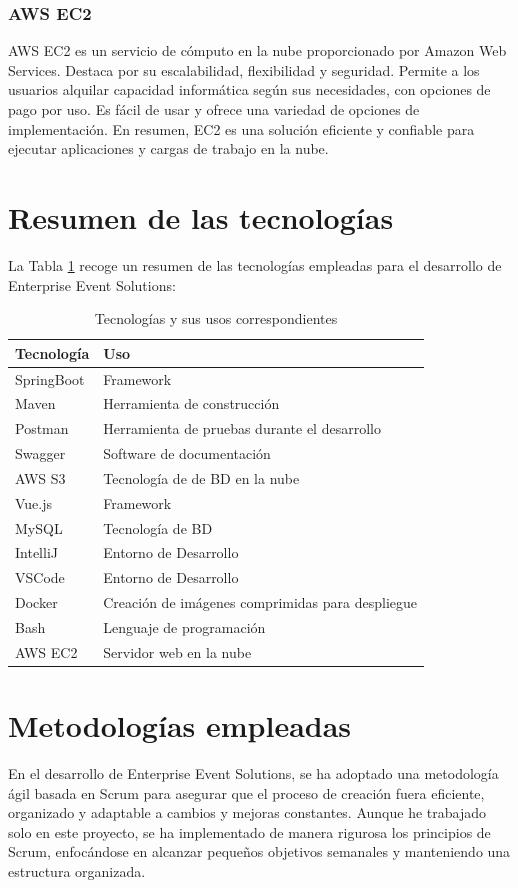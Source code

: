\subsubsection{AWS EC2}
AWS EC2 es un servicio de cómputo en la nube proporcionado por Amazon Web Services. Destaca por su escalabilidad, flexibilidad y seguridad.
Permite a los usuarios alquilar capacidad informática según sus necesidades, con opciones de pago por uso. Es fácil de usar y ofrece una variedad
de opciones de implementación. En resumen, EC2 es una solución eficiente y confiable para ejecutar aplicaciones y cargas de trabajo en la nube.

\section{Resumen de las tecnologías}
La Tabla \ref{tabla:tecnologias_usos} recoge un resumen de las tecnologías empleadas para el desarrollo de Enterprise Event Solutions:

\begin{table}[h]
\begin{tabular}{ p{3cm} l  }

    \hline
    Tecnología& Uso \\
    \hline
    SpringBoot   & Framework \\
    Maven &   Herramienta de construcción \\
    Postman & Herramienta de pruebas durante el desarrollo \\
    Swagger & Software de documentación \\
    AWS S3& Tecnología de de BD en la nube  \\
    Vue.js & Framework  \\
    MySQL    & Tecnología de BD \\
    IntelliJ&   Entorno de Desarrollo  \\
    VSCode& Entorno de Desarrollo \\
    Docker& Creación de imágenes comprimidas para despliegue  \\
    Bash& Lenguaje de programación \\
    AWS EC2& Servidor web en la nube  \\

    \hline
   \end{tabular}
   \caption{Tecnologías y sus usos correspondientes}
   \label{tabla:tecnologias_usos}
\end{table}


\section{Metodologías empleadas}
En el desarrollo de Enterprise Event Solutions, se ha adoptado una metodología ágil basada en Scrum para asegurar que el proceso de creación 
fuera eficiente, organizado y adaptable a cambios y mejoras constantes. Aunque he trabajado solo en este proyecto, se ha implementado de manera 
rigurosa los principios de Scrum, enfocándose en alcanzar pequeños objetivos semanales y manteniendo una estructura organizada.

